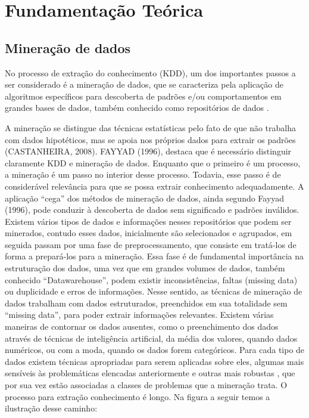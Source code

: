\documentclass[conference,compsoc]{IEEEtran}
\begin{document}
\section{Fundamentação Teórica}

\subsection{Mineração de dados}

No processo de extração do conhecimento (KDD), um dos
importantes passos a ser considerado é a mineração de dados, que se
caracteriza pela aplicação de algoritmos específicos para descoberta de
padrões e/ou comportamentos em grandes bases de dados, também
conhecido como repositórios de dados \cite[Fayyad]{Fayyad}.

A mineração se distingue das técnicas estatísticas pelo fato de que não
trabalha com dados hipotéticos, mas se apoia nos próprios dados para
extrair os padrões (CASTANHEIRA, 2008).
FAYYAD (1996), destaca que é necessário distinguir claramente
KDD e mineração de dados. Enquanto que o primeiro é um processo, a
mineração é um passo no interior desse processo. Todavia, esse passo
é de considerável relevância para que se possa extrair conhecimento
adequadamente. A aplicação “cega” dos métodos de mineração de
dados, ainda segundo Fayyad (1996), pode conduzir à descoberta de
dados sem significado e padrões inválidos.
Existem vários tipos de dados e informações nesses repositórios que
podem ser minerados, contudo esses dados, inicialmente são
selecionados e agrupados, em seguida passam por uma fase de
preprocessamento, que consiste em tratá-los de forma a prepará-los
para a mineração. Essa fase é de fundamental importância na
estruturação dos dados, uma vez que em grandes volumes de dados,
também conhecido “Datawarehouse”, podem existir inconsistências,
faltas (missing data) ou duplicidade e erros de informações.
Nesse sentido, as técnicas de mineração de dados trabalham com
dados estruturados, preenchidos em sua totalidade sem ``missing data'',
para poder extrair informações relevantes. Existem várias maneiras de
 contornar os dados ausentes, como o preenchimento dos dados
através de técnicas de inteligência artificial, da média dos valores,
quando dados numéricos, ou com a moda, quando os dados forem
categóricos. Para cada tipo de dados existem técnicas apropriadas para
serem aplicadas sobre eles, algumas mais sensíveis às problemáticas
elencadas anteriormente e outras mais robustas \cite{DataMining2}, que por sua vez
estão associadas a classes de problemas que a mineração trata.
O processo para extração conhecimento é longo. 
Na figura a seguir temos a ilustração desse caminho:
\end{document}
